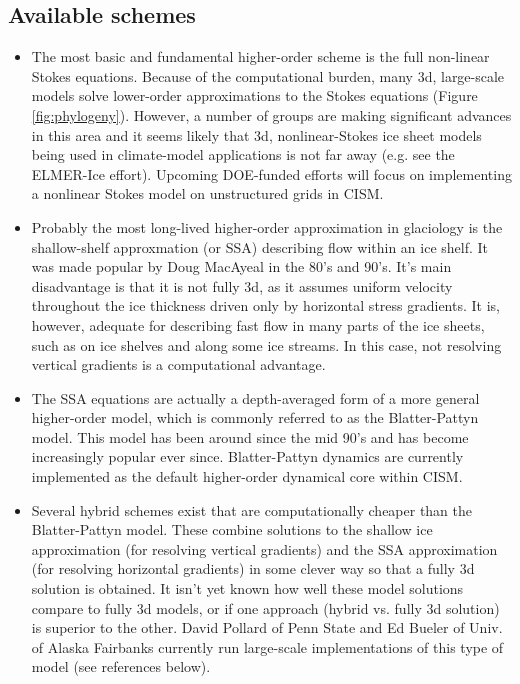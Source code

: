 \subsection{Available schemes}

\begin{itemize}
\item The most basic and fundamental higher-order scheme is the full non-linear Stokes equations. Because of the computational burden, many 3d, large-scale models solve lower-order approximations to the Stokes equations (Figure \ref{fig:phylogeny}). However, a number of groups are making significant advances in this area and it seems likely that 3d, nonlinear-Stokes ice sheet models being used in climate-model applications is not far away (e.g. see the ELMER-Ice effort). Upcoming DOE-funded efforts will focus on implementing a nonlinear Stokes model on unstructured grids in CISM.
\end{itemize}

\begin{itemize}
\item Probably the most long-lived higher-order approximation in glaciology is the shallow-shelf approxmation (or SSA) describing flow within an ice shelf. It was made popular by Doug MacAyeal in the 80's and 90's. It's main disadvantage is that it is not fully 3d, as it assumes uniform velocity throughout the ice thickness driven only by horizontal stress gradients. It is, however, adequate for describing fast flow in many parts of the ice sheets, such as on ice shelves and along some ice streams. In this case, not resolving vertical gradients is a computational advantage.   
\end{itemize}

\begin{itemize}
\item The SSA equations are actually a depth-averaged form of a more general higher-order model, which is commonly referred to as the Blatter-Pattyn model. This model has been around since the mid 90's and has become increasingly popular ever since. Blatter-Pattyn dynamics are currently implemented as the default higher-order dynamical core within CISM. 
\end{itemize}

\begin{itemize}
\item Several hybrid schemes exist that are computationally cheaper than the Blatter-Pattyn model. These combine solutions to the shallow ice approximation (for resolving vertical gradients) and the SSA approximation (for resolving horizontal gradients) in some clever way so that a fully 3d solution is obtained. It isn't yet known how well these model solutions compare to fully 3d models, or if one approach (hybrid vs. fully 3d solution) is superior to the other. David Pollard of Penn State and Ed Bueler of Univ. of Alaska Fairbanks currently run large-scale implementations of this type of model (see references below).
\end{itemize}

